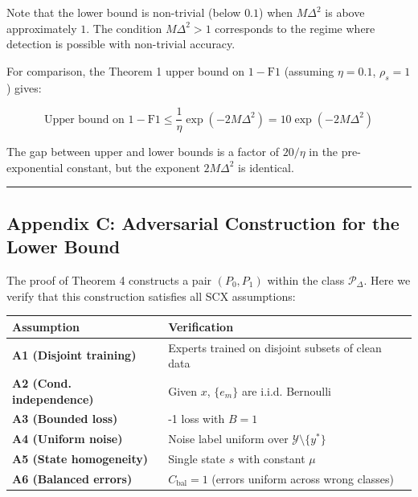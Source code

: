 \documentclass[
  12pt,
]{article}
\begin{document}
Note that the lower bound is non-trivial (below \(0.1\)) when
\(M\Delta^2\) is above approximately \(1\). The condition
\(M\Delta^2 > 1\) corresponds to the regime where detection is possible
with non-trivial accuracy.

For comparison, the Theorem 1 upper bound on \(1-\text{F1}\) (assuming
\(\eta=0.1\), \(\rho_s=1\)) gives:

\[\text{Upper bound on } 1-\text{F1} \leq \frac{1}{\eta}\exp(-2M\Delta^2) = 10\exp(-2M\Delta^2)\]

The gap between upper and lower bounds is a factor of \(20/\eta\) in the
pre-exponential constant, but the exponent \(2M\Delta^2\) is identical.

\begin{center}\rule{0.5\linewidth}{0.5pt}\end{center}

\subsection{Appendix C: Adversarial Construction for the Lower
Bound}\label{appendix-c-adversarial-construction-for-the-lower-bound}

The proof of Theorem 4 constructs a pair \((P_0, P_1)\) within the class
\(\mathcal{P}_\Delta\). Here we verify that this construction satisfies
all SCX assumptions:

\begin{longtable}[]{@{}
  >{\raggedright\arraybackslash}p{}
  >{\raggedright\arraybackslash}p{}@{}}
\toprule\noalign{}
\begin{minipage}[b]{\linewidth}\raggedright
Assumption
\end{minipage} & \begin{minipage}[b]{\linewidth}\raggedright
Verification
\end{minipage} \\
\midrule\noalign{}
\endhead
\bottomrule\noalign{}
\endlastfoot
\textbf{A1 (Disjoint training)} & Experts trained on disjoint subsets of
clean data \\
\textbf{A2 (Cond. independence)} & Given \(x\), \(\{e_m\}\) are i.i.d.
Bernoulli \\
\textbf{A3 (Bounded loss)} & 0-1 loss with \(B=1\) \\
\textbf{A4 (Uniform noise)} & Noise label uniform over
\(\mathcal{Y}\setminus\{y^*\}\) \\
\textbf{A5 (State homogeneity)} & Single state \(s\) with constant
\(\mu\) \\
\textbf{A6 (Balanced errors)} & \(C_{\text{bal}} = 1\) (errors uniform
across wrong classes) \\
\end{longtable}
\end{document}
